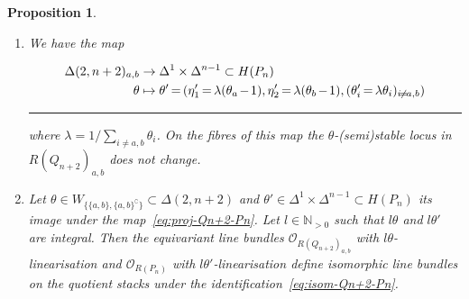 \documentclass[10pt,a4paper]{amsart}
\newtheorem{prop}[theo]{Proposition}
\theoremstyle{definition}
\def\N{\mathds N}
\def\O{\mathcal O}
\newenvironment{equationi}{\par\noindent\vspace*{\abovedisplayskip}\begin{minipage}{\linewidth}
\begin{equation}}{\end{equation}\end{minipage}\hrule height0pt\leavevmode}
\newcommand*{\Mk}{\mkern -2mu}
\begin{document}
\begin{prop}
\begin{enumerate}[label=(\alph*)]
\item\label{prop2.7_b} %
We have the map
\begin{equationi}\label{eq:proj-Qn+2-Pn}
\begin{aligned}[t]
\Delta(2,n+2)_{a,b}&\to\Delta^1\times\Delta^{n-1}\subset H(P_n)\\
\theta&\mapsto\theta'\Mk =\Mk (\eta'_1\Mk =\Mk \lambda(\theta_a\Mk -\Mk 1),\eta'_2\Mk =\Mk \lambda(\theta_b\Mk -\Mk 1),
(\theta'_i\Mk =\Mk \lambda\theta_i)_{i\Mk \neq \Mk a,b})
\end{aligned}
\end{equationi}

\noindent
where $\lambda=1/\sum_{i\neq a,b}\theta_i$.
On the fibres of this map the $\theta$-(semi)stable locus in
$R(Q_{n+2})_{a,b}$ does not change. %

\item\label{prop2.7_c}
Let $\theta\in W_{\{\{a,b\},\{a,b\}^\complement\}}\subset\Delta(2,n+2)$ and 
$\theta'\in\Delta^1\times\Delta^{n-1}\subset H(P_n)$ its image under the
map~\eqref{eq:proj-Qn+2-Pn}.
Let $l\in\N_{>0}$ such that $l\theta$ and $l\theta'$ are integral. Then
the equivariant line bundles $\O_{R(Q_{n+2})_{a,b}}$ with $l\theta$-linearisation 
and $\O_{R(P_n)}$ with $l\theta'$-linearisation define isomorphic line bundles 
on the quotient stacks under the identification~\eqref{eq:isom-Qn+2-Pn}.
\end{enumerate}
\end{prop}
\end{document}

